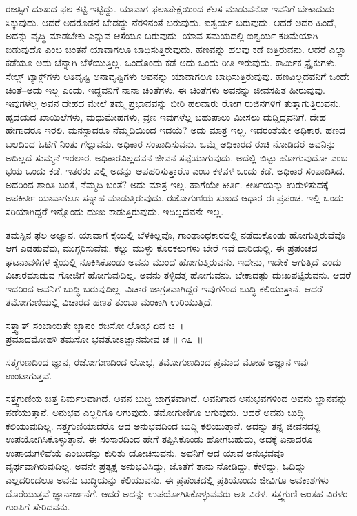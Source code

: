 ರಜಸ್ಸಿಗೆ ದುಃಖದ ಫಲ ಕಟ್ಟಿ ಇಟ್ಟಿದ್ದು. ಯಾವಾಗ ಫಲಾಪೇಕ್ಷೆಯಿಂದ ಕೆಲಸ ಮಾಡುವನೋ ಇವನಿಗೆ ಬೇಕಾದುದು ಸಿಕ್ಕುವುದು. ಆದರೆ ಅದರೊಡನೆ ಬೇಡದ್ದು ನೆರಳಿನಂತೆ ಬರುವುದು. ಐಶ್ವರ್ಯ ಬರುವುದು. ಆದರೆ ಅದರ ಹಿಂದೆ, ಅದನ್ನು ವೃದ್ಧಿ ಮಾಡಬೇಕು ಎನ್ನುವ ಆಸೆಯೂ ಬರುವುದು. ಯಾವ ಸಮಯದಲ್ಲಿ ಐಶ್ವರ್ಯ ಕಡಿಮೆಯಾಗಿ ಬಿಡುವುದೊ ಎಂಬ ಚಿಂತನೆ ಯಾವಾಗಲೂ ಬಾಧಿಸುತ್ತಿರುವುದು. ಹಣವನ್ನು ಹಲವು ಕಡೆ ಬಿತ್ತಿರುವನು. ಆದರೆ ಎಲ್ಲಾ ಕಡೆಯೂ ಅದು ಚೆನ್ನಾಗಿ ಬೆಳೆಯುತ್ತಿಲ್ಲ, ಒಂದೊಂದು ಕಡೆ ಅದು ಒಂದು ರೀತಿ ಇರುವುದು. ಕಾರ್ಮಿಕ ಸ್ಟ್ರೈಕುಗಳು, ಸೇಲ್ಸ್ ಟ್ಯಾಕ್ಸ್​ಗಳು ಅತಿವೃಷ್ಟಿ ಅನಾವೃಷ್ಟಿಗಳು ಅವನನ್ನು ಯಾವಾಗಲೂ ಬಾಧಿಸುತ್ತಿರುವುವು. ಹಣವಿಲ್ಲದವನಿಗೆ ಒಂದೇ ಚಿಂತೆ--ಅದು ಇಲ್ಲ ಎಂದು. ಇದ್ದವನಿಗೆ ನಾನಾ ಚಿಂತೆಗಳು. ಈ ಚಿಂತೆಗಳು ಅವನನ್ನು ಜೀವಸಹಿತ ಹೀರುವುವು. ಇವುಗಳೆಲ್ಲ ಅವನ ದೇಹದ ಮೇಲೆ ತಮ್ಮ ಪ್ರಭಾವವನ್ನು ಬೀರಿ ಹಲವಾರು ರೋಗ ರುಜಿನಗಳಿಗೆ ತುತ್ತಾಗುತ್ತಿರುವನು. ಹೃದಯದ ಖಾಯಿಲೆಗಳು, ಮಧುಮೇಹಗಳು, ವ್ರಣ ಇವುಗಳೆಲ್ಲ ಬಹುಪಾಲು ಮೀಸಲು ದುಡ್ಡಿದ್ದವನಿಗೆ. ದೇಹ ಹೇಗಾದರೂ ಇರಲಿ. ಮನಸ್ಸಾದರೂ ನೆಮ್ಮದಿಯಿಂದ ಇದಯೆ? ಅದು ಮಾತ್ರ ಇಲ್ಲ. ಇದರಂತೆಯೇ ಅಧಿಕಾರ. ಹಣದ ಬಲದಿಂದ ಓಟಿಗೆ ನಿಂತು ಗೆಲ್ಲುವನು. ಅಧಿಕಾರ ಸಂಪಾದಿಸುವನು. ಒಮ್ಮೆ ಅಧಿಕಾರದ ರುಚಿ ನೋಡಿದರೆ ಅವನಿನ್ನು ಅದಿಲ್ಲದೆ ಸುಮ್ಮನೆ ಇರಲಾರ. ಅಧಿಕಾರವಿಲ್ಲದವನ ಜೀವನ ಸಪ್ಪೆಯಾಗುವುದು. ಅದೆಲ್ಲಿ ಬಿಟ್ಟು ಹೋಗುವುದೋ ಎಂಬ ಭಯ ಒಂದು ಕಡೆ. ಇತರರು ಎಲ್ಲಿ ಅದನ್ನು ಅಪಹರಿಸುತ್ತಾರೊ ಎಂಬ ಕಳವಳ ಒಂದು ಕಡೆ. ಅಧಿಕಾರ ಸಂಪಾದಿಸಿದ. ಅದರಿಂದ ಶಾಂತಿ ಬಂತೆ, ನೆಮ್ಮದಿ ಬಂತೆ? ಅದು ಮಾತ್ರ ಇಲ್ಲ. ಹಾಗೆಯೇ ಕೀರ್ತಿ. ಕೀರ್ತಿಯನ್ನು ಉರುಳಿಸುದಕ್ಕೆ ಅಪಕೀರ್ತಿ ಯಾವಾಗಲೂ ಸನ್ನಾಹ ಮಾಡುತ್ತಿರುವುದು. ರಜೋಗುಣಿಯ ಸುಖದ ಆಧಾರ ಈ ಪ್ರಪಂಚ. ಇಲ್ಲಿ ಒಂದು ಸರಿಯಾಗಿದ್ದರೆ ಇನ್ನೊಂದು ದುಃಖ ಕಾಡುತ್ತಿರುವುದು. ಇದಿಲ್ಲದವನೇ ಇಲ್ಲ.

ತಮಸ್ಸಿನ ಫಲ ಅಜ್ಞಾನ. ಯಾವಾಗ ಕೈಯಲ್ಲಿ ಬೆಳಕಿಲ್ಲವೊ, ಗಾಂಢಾಂಧಕಾರದಲ್ಲಿ ನಡೆದುಕೊಂಡು ಹೋಗುತ್ತಿರುವೆವೊ ಆಗ ಎಡಹುವೆವು, ಮುಗ್ಗರಿಸುವೆವು. ಕಲ್ಲು ಮುಳ್ಳು ಕೊರಕಲುಗಳು ಬೇರೆ ಇವೆ ದಾರಿಯಲ್ಲಿ. ಈ ಪ್ರಪಂಚದ ಘಟನಾವಳಿಗಳ ಕೈಯಲ್ಲಿ ನೂಕಿಸಿಕೊಂಡು ಅವನು ಮುಂದೆ ಹೋಗುತ್ತಿರುವನು. ಇದೇನು, ಇದೇಕೆ ಆಗುತ್ತಿದೆ ಎಂದು ವಿಚಾರಮಾಡುವ ಗೋಜಿಗೆ ಹೋಗುವುದಿಲ್ಲ. ಅವನು ತಳ್ಳಿದತ್ತ ಹೋಗುವನು. ಬೇಕಾದಷ್ಟು ದುಃಖಪಟ್ಟಿರುವನು. ಆದರೆ ಇದರಿಂದ ಅವನಿಗೆ ಬುದ್ಧಿ ಬರುವುದಿಲ್ಲ. ವಿಚಾರ ಜಾಗ್ರತವಾಗಿದ್ದರೆ ಇವುಗಳಿಂದ ಬುದ್ಧಿ ಕಲಿಯುತ್ತಾನೆ. ಆದರೆ ತಮೋಗುಣಿಯಲ್ಲಿ ವಿಚಾರದ ಹಣತೆ ತುಂಬಾ ಮಂಕಾಗಿ ಉರಿಯುತ್ತಿದೆ.

\begin{shloka}
ಸತ್ತ್ವಾತ್ ಸಂಜಾಯತೇ ಜ್ಞಾನಂ ರಜಸೋ ಲೋಭ ಏವ ಚ~।\\ಪ್ರಮಾದಮೋಹೌ ತಮಸೋ ಭವತೋಽಜ್ಞಾನಮೇವ ಚ \hfill॥ ೧೭~॥
\end{shloka}

\begin{artha}
ಸತ್ತ್ವಗುಣದಿಂದ ಜ್ಞಾನ, ರಜೋಗುಣದಿಂದ ಲೋಭ, ತಮೋಗುಣದಿಂದ ಪ್ರಮಾದ ಮೋಹ ಅಜ್ಞಾನ ಇವು ಉಂಟಾಗುತ್ತವೆ.
\end{artha}

ಸತ್ತ್ವಗುಣಿಯ ಚಿತ್ತ ನಿರ್ಮಲವಾಗಿದೆ. ಅವನ ಬುದ್ಧಿ ಜಾಗ್ರತವಾಗಿದೆ. ಅವನಿಗಾದ ಅನುಭವಗಳಿಂದ ಅವನು ಜ್ಞಾನವನ್ನು ಪಡೆಯುತ್ತಾನೆ. ಅನುಭವ ಎಲ್ಲರಿಗೂ ಆಗುವುದು. ತಮೋಗುಣಿಗೂ ಆಗುವುದು. ಆದರೆ ಅವನು ಬುದ್ಧಿ ಕಲಿಯುವುದಿಲ್ಲ. ಸತ್ತ್ವಗುಣಿಯಾದರೊ ಆದ ಅನುಭವದಿಂದ ಬುದ್ಧಿ ಕಲಿಯುತ್ತಾನೆ. ಅದನ್ನು ತನ್ನ ಜೀವನದಲ್ಲಿ ಉಪಯೋಗಿಸಿಕೊಳ್ಳುತ್ತಾನೆ. ಈ ಸಂಸಾರದಿಂದ ಹೇಗೆ ತಪ್ಪಿಸಿಕೊಂಡು ಹೋಗಬಹುದು, ಅದಕ್ಕೆ ಏನಾದರೂ ಉಪಾಯ\-ಗಳಿವೆಯೆ ಎಂಬುದನ್ನು ಕುರಿತು ಯೋಚಿಸುವನು. ಅವನಿಗೆ ಆದ ಯಾವ ಅನುಭವವೂ ವ್ಯರ್ಥವಾಗಿರುವುದಿಲ್ಲ. ಅವನೇ ಪ್ರತ್ಯಕ್ಷ ಅನುಭವಿಸಿದ್ದು, ಜೊತೆಗೆ ತಾನು ನೋಡಿದ್ದು, ಕೇಳಿದ್ದು, ಓದಿದ್ದು ಎಲ್ಲದರಿಂದಲೂ ಅವನು ಬುದ್ಧಿಯನ್ನು ಕಲಿಯುವನು. ಈ ಪ್ರಪಂಚದಲ್ಲಿ ಪ್ರತಿಯೊಂದು ಜೀವಿಗೂ ಅವಕಾಶಗಳು ದೊರೆಯುತ್ತವೆ ಜ್ಞಾನಾರ್ಜನೆಗೆ. ಆದರೆ ಅದನ್ನು ಉಪಯೋಗಿಸಿಕೊಳ್ಳುವವರು ಅತಿ ವಿರಳ. ಸತ್ತ್ವಗುಣಿ ಅಂತಹ ವಿರಳರ ಗುಂಪಿಗೆ ಸೇರಿದವನು.

